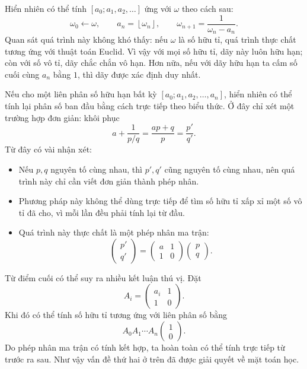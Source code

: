 \documentclass[11pt]{article}
\newcommand{\floor}[1]{\left\lfloor #1\right\rfloor}
\begin{document}
Hiển nhiên có thể tính $[a_0;a_1,a_2,\ldots]$ ứng với $\omega$ theo cách sau:
\[
  \omega_0\gets\omega,\qquad
  a_n=\floor{\omega_n},\qquad
  \omega_{n+1}=\frac{1}{\omega_n-a_n}.
\]
Quan sát quá trình này không khó thấy: nếu $\omega$ là số hữu tỉ, quá trình
thực chất tương ứng với thuật toán Euclid. Vì vậy với mọi số hữu tỉ, dãy này
luôn hữu hạn; còn với số vô tỉ, dãy chắc chắn vô hạn. Hơn nữa, nếu với dãy hữu
hạn ta cấm số cuối cùng $a_n$ bằng $1$, thì dãy được xác định duy nhất.

Nếu cho một liên phân số hữu hạn bất kỳ
$[a_0;a_1,a_2,\ldots,a_n]$, hiển nhiên có thể tính lại phân số ban đầu bằng
cách trực tiếp theo biểu thức. Ở đây chỉ xét một trường hợp đơn giản: khôi
phục
\[
  a+\frac{1}{p/q}=\frac{ap+q}{p}=\frac{p'}{q'}.
\]
Từ đây có vài nhận xét:

\begin{itemize}
  \item Nếu $p,q$ nguyên tố cùng nhau, thì $p',q'$ cũng nguyên tố cùng nhau,
  nên quá trình này chỉ cần viết đơn giản thành phép nhân.
  \item Phương pháp này không thể dùng trực tiếp để tìm số hữu tỉ xấp xỉ một
  số vô tỉ đã cho, vì mỗi lần đều phải tính lại từ đầu.
  \item Quá trình này thực chất là một phép nhân ma trận:
  \[
    \begin{pmatrix}p'\\ q'\end{pmatrix}
    =
    \begin{pmatrix}a&1\\1&0\end{pmatrix}
    \begin{pmatrix}p\\ q\end{pmatrix}.
  \]
\end{itemize}

Từ điểm cuối có thể suy ra nhiều kết luận thú vị. Đặt
\[
  A_i=\begin{pmatrix}a_i&1\\1&0\end{pmatrix}.
\]
Khi đó có thể tính số hữu tỉ tương ứng với liên phân số bằng
\[
  A_0A_1\cdots A_n\begin{pmatrix}1\\0\end{pmatrix}.
\]
Do phép nhân ma trận có tính kết hợp, ta hoàn toàn có thể tính trực tiếp từ
trước ra sau. Như vậy vấn đề thứ hai ở trên đã được giải quyết về mặt toán
học.
\end{document}
